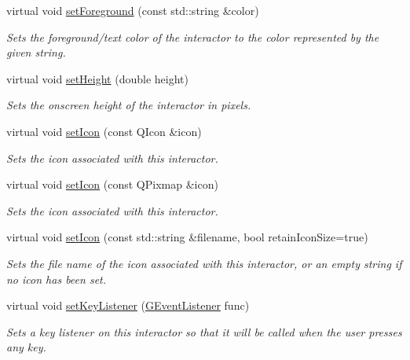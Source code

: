 \begin{DoxyCompactItemize}
virtual void \mbox{\hyperlink{classsgl_1_1GInteractor_af59209aeadea6dfc6d97a2d8531f50e1}{set\+Foreground}} (const std\+::string \&color)
\begin{DoxyCompactList}\small\item\em Sets the foreground/text color of the interactor to the color represented by the given string. \end{DoxyCompactList}\item 
virtual void \mbox{\hyperlink{classsgl_1_1GInteractor_a9e280bfc4544dfaf8e4376c4e1a74357}{set\+Height}} (double height)
\begin{DoxyCompactList}\small\item\em Sets the onscreen height of the interactor in pixels. \end{DoxyCompactList}\item 
virtual void \mbox{\hyperlink{classsgl_1_1GInteractor_a542abfcd7261751352af129c7215ecda}{set\+Icon}} (const Q\+Icon \&icon)
\begin{DoxyCompactList}\small\item\em Sets the icon associated with this interactor. \end{DoxyCompactList}\item 
virtual void \mbox{\hyperlink{classsgl_1_1GInteractor_a368e1a338f84401c284506d03b1ba769}{set\+Icon}} (const Q\+Pixmap \&icon)
\begin{DoxyCompactList}\small\item\em Sets the icon associated with this interactor. \end{DoxyCompactList}\item 
virtual void \mbox{\hyperlink{classsgl_1_1GInteractor_a762e139aa311461c3984d3ad28293f64}{set\+Icon}} (const std\+::string \&filename, bool retain\+Icon\+Size=true)
\begin{DoxyCompactList}\small\item\em Sets the file name of the icon associated with this interactor, or an empty string if no icon has been set. \end{DoxyCompactList}\item 
virtual void \mbox{\hyperlink{classsgl_1_1GInteractor_aeb8324d3287fa1fbe093f4d6230cf0a6}{set\+Key\+Listener}} (\mbox{\hyperlink{namespacesgl_ae9f3e9eab70035da1a2b114e21357b25}{G\+Event\+Listener}} func)
\begin{DoxyCompactList}\small\item\em Sets a key listener on this interactor so that it will be called when the user presses any key. \end{DoxyCompactList}\item 

\end{DoxyCompactItemize}
